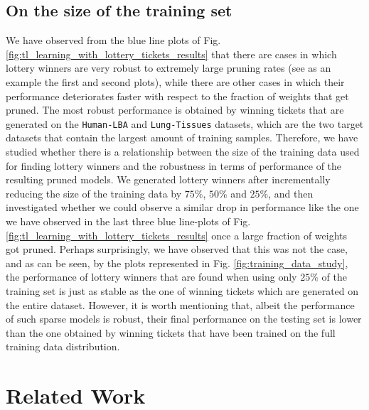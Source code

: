 



\subsection{On the size of the training set}
We have observed from the blue line plots of Fig. \ref{fig:tl_learning_with_lottery_tickets_results} that there are cases in which lottery winners are very robust to extremely large pruning rates (see as an example the first and second plots), while there are other cases in which their performance deteriorates faster with respect to the fraction of weights that get pruned. The most robust performance is obtained by winning tickets that are generated on the \texttt{Human-LBA} and \texttt{Lung-Tissues} datasets, which are the two target datasets that contain the largest amount of training samples. Therefore, we have studied whether there is a relationship between the size of the training data used for finding lottery winners and the robustness in terms of performance of the resulting pruned models. We generated lottery winners after incrementally reducing the size of the training data by $75\%$, $50\%$ and $25\%$, and then investigated whether we could observe a similar drop in performance like the one we have observed in the last three blue line-plots of Fig. \ref{fig:tl_learning_with_lottery_tickets_results} once a large fraction of weights got pruned. Perhaps surprisingly, we have observed that this was not the case, and as can be seen, by the plots represented in Fig. \ref{fig:training_data_study}, the performance of lottery winners that are found when using only $25\%$ of the training set is just as stable as the one of winning tickets which are generated on the entire dataset. However, it is worth mentioning that, albeit the performance of such sparse models is robust, their final performance on the testing set is lower than the one obtained by winning tickets that have been trained on the full training data distribution.




\section{Related Work}
\label{sec:related_work}

